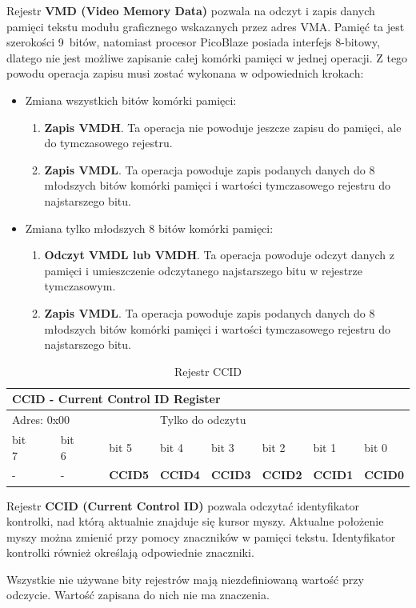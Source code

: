 Rejestr \textbf{VMD (Video Memory Data)} pozwala na odczyt i zapis danych pamięci tekstu modułu graficznego wskazanych przez adres VMA. Pamięć ta jest szerokości 9~bitów, natomiast procesor PicoBlaze posiada interfejs 8-bitowy, dlatego nie jest możliwe zapisanie całej komórki pamięci w jednej operacji. Z tego powodu operacja zapisu musi zostać wykonana w odpowiednich krokach:
\begin{itemize}
	\item Zmiana wszystkich bitów komórki pamięci:
	\begin{enumerate}
		\item \textbf{Zapis VMDH}. Ta operacja nie powoduje jeszcze zapisu do pamięci, ale do tymczasowego rejestru.
		\item \textbf{Zapis VMDL}. Ta operacja powoduje zapis podanych danych do 8 młodszych bitów komórki pamięci i wartości tymczasowego rejestru do najstarszego bitu.
	\end{enumerate}
	\item Zmiana tylko młodszych 8 bitów komórki pamięci:
	\begin{enumerate}
		\item \textbf{Odczyt VMDL lub VMDH}. Ta operacja powoduje odczyt danych z pamięci i umieszczenie odczytanego najstarszego bitu w rejestrze tymczasowym.
		\item \textbf{Zapis VMDL}. Ta operacja powoduje zapis podanych danych do 8 młodszych bitów komórki pamięci i wartości tymczasowego rejestru do najstarszego bitu.
	\end{enumerate}
\end{itemize}


\begin{table}[h]
	\begin{center}
		{\footnotesize
		\begin{tabular}{|l|l|l|l|l|l|l|l|}
			\hline
			\multicolumn{8}{|l|}{ \textbf{CCID - Current Control ID Register} } \\
			\hline
			\multicolumn{3}{|l}{ Adres: 0x00 } & \multicolumn{5}{l|}{ Tylko do odczytu } \\
			\hline
			\hline bit 7~~~~ & bit 6~~~~ & bit 5 & bit 4 & bit 3 & bit 2 & bit 1 & bit 0 \\				
			\hline - & - & \textbf{CCID5} & \textbf{CCID4} & \textbf{CCID3} & \textbf{CCID2} & \textbf{CCID1} & \textbf{CCID0} \\				
			\hline 
		\end{tabular}}
		\label{tab:videoCCID}
		\caption{ Rejestr CCID }
	\end{center}
\end{table}

Rejestr \textbf{CCID (Current Control ID)} pozwala odczytać identyfikator kontrolki, nad którą aktualnie znajduje się kursor myszy. Aktualne położenie myszy można zmienić przy pomocy znaczników w pamięci tekstu. Identyfikator kontrolki również określają odpowiednie znaczniki.

Wszystkie nie używane bity rejestrów mają niezdefiniowaną wartość przy odczycie. Wartość zapisana do nich nie ma znaczenia.



